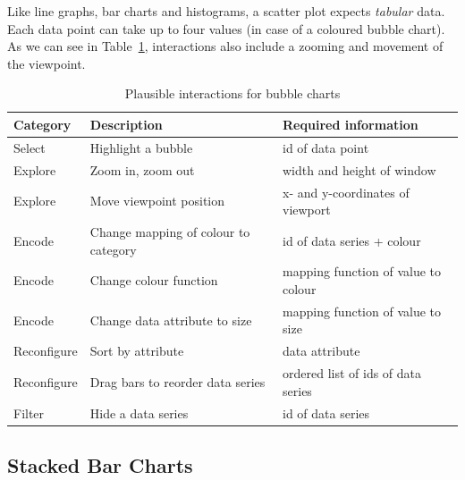 Like line graphs, bar charts and histograms, a scatter plot expects \emph{tabular} data.
Each data point can take up to four values (in case of a coloured bubble chart).
As we can see in Table~\ref{tab:analysis:bubble-charts:interactions}, interactions also include a zooming and movement of the viewpoint.
\begin{table}[H]
  \begin{tabular*}{\textwidth}{lll}
    \bf Category & \bf Description & \bf Required information \\
    \hline
    Select & Highlight a bubble & id of data point \\
    Explore & Zoom in, zoom out & width and height of window \\
    Explore & Move viewpoint position & x- and y-coordinates of viewport \\
    Encode & Change mapping of colour to category & id of data series + colour \\
    Encode & Change colour function & mapping function of value to colour \\
    Encode & Change data attribute to size & mapping function of value to size \\
    Reconfigure & Sort by attribute & data attribute \\
    Reconfigure & Drag bars to reorder data series & ordered list of ids of data series \\
    Filter & Hide a data series & id of data series \\
  \end{tabular*}
  \caption{Plausible interactions for bubble charts}%
  \label{tab:analysis:bubble-charts:interactions}
\end{table}

\subsection{Stacked Bar Charts}

